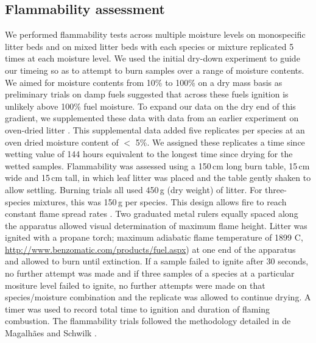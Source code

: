 \documentclass[fire,article,submit,moreauthors,pdftex]{Definitions/mdpi}
\begin{document}
\subsection{Flammability assessment}

We performed flammability tests across multiple moisture levels on monospecific
litter beds and on mixed litter beds with each species or mixture replicated 5
times at each moisture level. We used the initial dry-down experiment to guide
our timeing so as to attempt to burn samples over a range of moisture contents.
We aimed for moisture contents from 10\% to 100\% on a dry mass basis as
preliminary trials on damp fuels suggested that across these fuels ignition is
unlikely above 100\% fuel moisture. To expand our data on the dry end of this
gradient, we supplemented these data with data from an earlier experiment on
oven-dried litter \cite{Magalhaes+Schwilk-2012}. This supplemental data added
five replicates per species at an oven dried moisture content of $<$ 5\%. We
assigned these replicates a time since wetting value of 144 hours equivalent to
the longest time since drying for the wetted samples. Flammability was assessed
using a 150\,cm long burn table, 15\,cm wide and 15\,cm tall, in which leaf
litter was placed and the table gently shaken to allow settling. Burning trials
all used 450\,g (dry weight) of litter. For three-species mixtures, this was
150\,g per species. This design allows fire to reach constant flame spread
rates \cite{Magalhaes+Schwilk-2012}. Two graduated metal rulers equally spaced
along the apparatus allowed visual determination of maximum flame height.
Litter was ignited with a propane torch; maximum adiabatic flame temperature of
1899 C, \url{http://www.benzomatic.com/products/fuel.aspx}) at one end of the
apparatus and allowed to burn until extinction. If a sample failed to ignite
after 30 seconds, no further attempt was made and if three samples of a species
at a particular mositure level failed to ignite, no further attempts were made
on that species/moisture combination and the replicate was allowed to continue
drying. A timer was used to record total time to ignition and duration of
flaming combustion. The flammability trials followed the methodology detailed
in de Magalhães and Schwilk \cite{Magalhaes+Schwilk-2012}.

 
\end{document}
